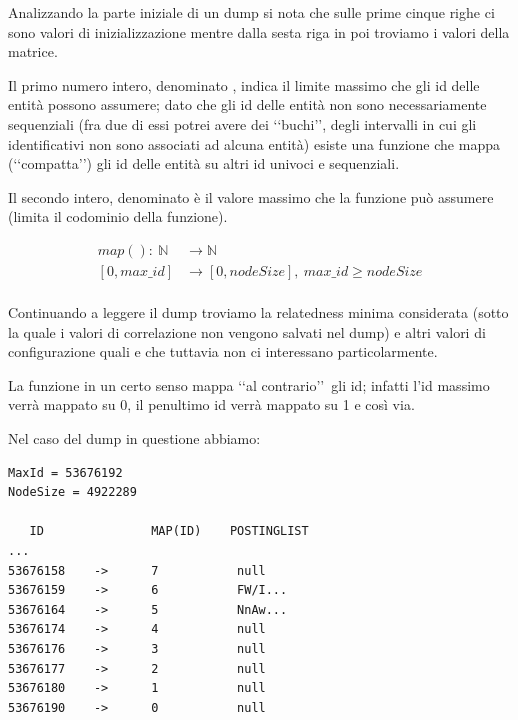 Analizzando la parte iniziale di un dump si nota che sulle prime cinque righe ci sono valori di inizializzazione mentre dalla sesta riga in poi troviamo i valori della matrice.

Il primo numero intero, denominato , indica il limite massimo che gli id delle entità possono assumere; 
dato che gli id delle entità non sono necessariamente sequenziali 
(fra due di essi potrei avere dei \lq\lq buchi\rq\rq, degli intervalli in cui gli identificativi non sono associati ad alcuna entità) 
esiste una funzione  che mappa (\lq\lq compatta\rq\rq) gli id delle entità su altri id univoci e sequenziali. 

Il secondo intero, denominato  è il valore massimo che la funzione  può assumere (limita il codominio della funzione).

\begin{equation}\begin{split}
    map():\ \mathbb{N} & \rightarrow \mathbb{N}\\
            [0,max\_id] & \rightarrow [0, nodeSize],\ max\_id \geq nodeSize\\
\end{split}\end{equation}

Continuando a leggere il dump troviamo la relatedness minima considerata  (sotto la quale i valori di correlazione non vengono salvati nel dump) 
e altri valori di configurazione quali  e  che tuttavia non ci interessano particolarmente.

La funzione  in un certo senso mappa \lq\lq al contrario\rq\rq\ gli id; infatti l'id massimo verrà mappato su 0, il penultimo id verrà mappato su 1 e così via.

Nel caso del dump in questione abbiamo:

\begin{lstlisting}[style=TeXStyle, caption=Esempio di funzione map e postingList]
MaxId = 53676192
NodeSize = 4922289

   ID		        MAP(ID)    POSTINGLIST
...
53676158    ->      7           null
53676159    ->      6           FW/I...
53676164    ->      5           NnAw...
53676174    ->      4           null
53676176    ->      3           null
53676177    ->      2           null
53676180    ->      1           null
53676190    ->      0           null
\end{lstlisting}

